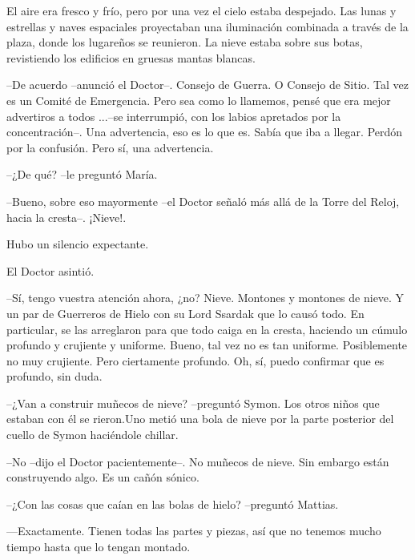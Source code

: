 El aire era fresco y frío, pero por una vez el cielo estaba despejado. Las lunas y estrellas y naves espaciales proyectaban una iluminación combinada a través de la plaza, donde los lugareños se reunieron. La nieve estaba sobre sus botas, revistiendo los edificios en gruesas mantas blancas.



--De acuerdo --anunció el Doctor--. Consejo de Guerra. O Consejo de Sitio. Tal vez es un Comité de Emergencia. Pero sea como lo llamemos, pensé que era mejor advertiros a todos ...--se interrumpió, con los labios apretados por la concentración--. Una advertencia, eso es lo que es. Sabía que iba a llegar. Perdón por la confusión. Pero sí, una advertencia.



--¿De qué? --le preguntó María.



--Bueno, sobre eso mayormente --el Doctor señaló más allá de la Torre del Reloj, hacia la cresta--. ¡Nieve!.



Hubo un silencio expectante.



El Doctor asintió.


--Sí, tengo vuestra atención ahora, ¿no?  Nieve. Montones y montones de nieve. Y un par de Guerreros de Hielo con su Lord Ssardak que lo causó todo. En particular, se las arreglaron para que todo caiga en la cresta, haciendo un cúmulo profundo y crujiente y uniforme. Bueno, tal vez no es tan uniforme. Posiblemente no muy crujiente. Pero ciertamente profundo. Oh, sí, puedo confirmar que es profundo, sin duda.



--¿Van a construir muñecos de nieve? --preguntó Symon. Los otros niños que estaban con él se rieron.Uno metió una bola de nieve por la parte posterior del cuello de Symon haciéndole chillar.



--No --dijo el Doctor pacientemente--. No muñecos de nieve. Sin embargo están construyendo algo. Es un cañón sónico.



--¿Con las cosas que caían en las bolas de hielo? --preguntó Mattias.



—Exactamente. Tienen todas las partes y piezas, así que no tenemos mucho tiempo hasta que lo tengan montado.



